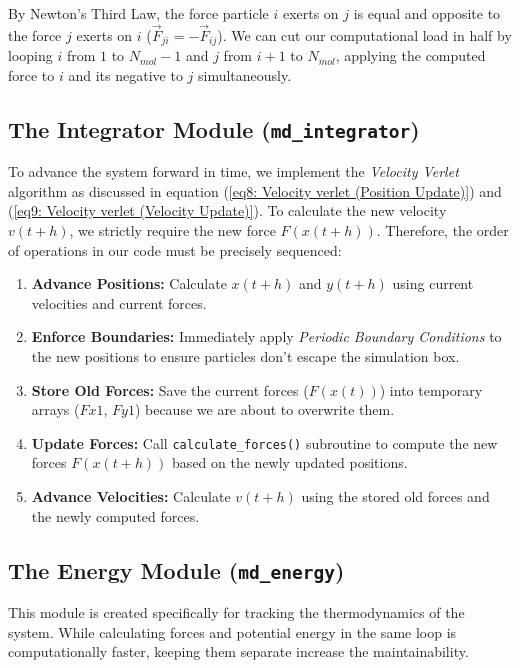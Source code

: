 \documentclass[12pt, a4paper, oneside]{article}
\begin{document}
        By Newton's Third Law, the force particle $i$ exerts on $j$ is equal and opposite to the force $j$ exerts on $i$ ($\vec{F}_{ji} = -\vec{F}_{ij}$). We can cut our computational load in half by looping $i$ from $1$ to $N_{mol}-1$ and $j$ from $i+1$ to $N_{mol}$, applying the computed force to $i$ and its negative to $j$ simultaneously.
        

        \subsection{The Integrator Module (\texttt{md\_integrator})}
        To advance the system forward in time, we implement the \textit{Velocity Verlet} algorithm as discussed in equation (\ref{eq8: Velocity verlet (Position Update)}) and (\ref{eq9: Velocity verlet (Velocity Update)}). To calculate the new velocity $v(t+h)$, we strictly require the new force $F(x(t+h))$. Therefore, the order of operations in our code must be precisely sequenced:
        \begin{enumerate}
            \item {\bf Advance Positions:} Calculate $x(t+h)$ and $y(t+h)$ using current velocities and current forces.
            \item {\bf Enforce Boundaries:} Immediately apply \textit{Periodic Boundary Conditions} to the new positions to ensure particles don't escape the simulation box.
            \item {\bf Store Old Forces:} Save the current forces ($F(x(t))$) into temporary arrays ($Fx1$, $Fy1$) because we are about to overwrite them.
            \item {\bf Update Forces:} Call \texttt{calculate\_forces()} subroutine to compute the new forces $F(x(t+h))$ based on the newly updated positions.
            \item {\bf Advance Velocities:} Calculate $v(t+h)$ using the stored old forces and the newly computed forces.
        \end{enumerate}
        

        \subsection{The Energy Module (\texttt{md\_energy})}
        This module is created specifically for tracking the thermodynamics of the system. While calculating forces and potential energy in the same loop is computationally faster, keeping them separate increase the maintainability.
        
\end{document}
